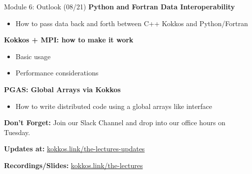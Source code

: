 \begin{frame}{Module 6: Outlook (08/21)}
    \vspace{-3pt}
	\textbf{Python and Fortran Data Interoperability}
	\begin{itemize}
        \item {How to pass data back and forth between C++ Kokkos and Python/Fortran}
	\end{itemize}
	
	\vspace{5pt}
	\textbf{Kokkos + MPI: how to make it work}
	\begin{itemize}
		\item {Basic usage}
		\item {Performance considerations}
	\end{itemize}

	\vspace{5pt}
	\textbf{PGAS: Global Arrays via Kokkos}
	\begin{itemize}
		\item {How to write distributed code using a global arrays like interface}
	\end{itemize}

	\vspace{5pt}
	\textbf{Don't Forget:} Join our Slack Channel and drop into our office hours on Tuesday.
	
	\vspace{5pt}
	\textbf{Updates at:} \href{https://kokkos.link/the-lectures-updates}{kokkos.link/the-lectures-updates}
	
	\vspace{5pt}
	\textbf{Recordings/Slides:} \href{https://kokkos.link/the-lectures}{kokkos.link/the-lectures}

\end{frame}



